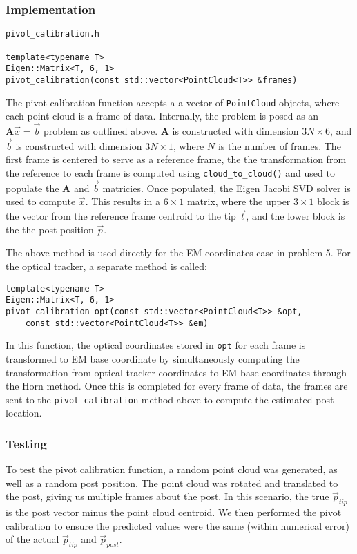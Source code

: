\documentclass[letterpaper, 11pt]{report}
\newcommand{\mat}[1]{\mathbf{#1}}
\begin{document}
 \subsubsection{Implementation}
 \begin{verbatim}
pivot_calibration.h

template<typename T>
Eigen::Matrix<T, 6, 1>
pivot_calibration(const std::vector<PointCloud<T>> &frames)
 \end{verbatim}
 The pivot calibration function accepts a a vector of \texttt{PointCloud} objects, where each point cloud is a frame of data. Internally, the problem is posed as an $\mat{A}\vec x= \vec b$ problem as outlined above. $\mat A$ is constructed with dimension $3N \times 6$, and $\vec b$ is constructed with dimension $3N \times 1$, where $N$ is the number of frames. The first frame is centered to serve as a reference frame, the the transformation from the reference to each frame is computed using \texttt{cloud\_to\_cloud()} and used to populate the $\mat A$ and $\vec b$ matricies. Once populated, the Eigen Jacobi SVD solver is used to compute $\vec x$. This results in a $6 \times 1$ matrix, where the upper $3 \times 1$ block is the vector from the reference frame centroid to the tip $\vec t$, and the lower block is the the post position $\vec p$.
 
The above method is used directly for the EM coordinates case in problem 5. For the optical tracker, a separate method is called:
 \begin{verbatim}
template<typename T>
Eigen::Matrix<T, 6, 1>
pivot_calibration_opt(const std::vector<PointCloud<T>> &opt, 
	const std::vector<PointCloud<T>> &em) 
 \end{verbatim}
 In this function, the optical coordinates stored in \texttt{opt} for each frame is transformed to EM base coordinate by simultaneously computing the transformation from optical tracker coordinates to EM base coordinates through the Horn method. Once this is completed for every frame of data, the frames are sent to the \texttt{pivot\_calibration} method above to compute the estimated post location.
 
 \subsubsection{Testing}
To test the pivot calibration function, a random point cloud was generated, as well as a random post position. The point cloud was rotated and translated to the post, giving us multiple frames about the post. In this scenario, the true $\vec p_{tip}$ is the post vector minus the point cloud centroid. We then performed the pivot calibration to ensure the predicted values were the same (within numerical error) of the actual $\vec p_{tip}$ and $\vec p_{post}$.
\end{document}
